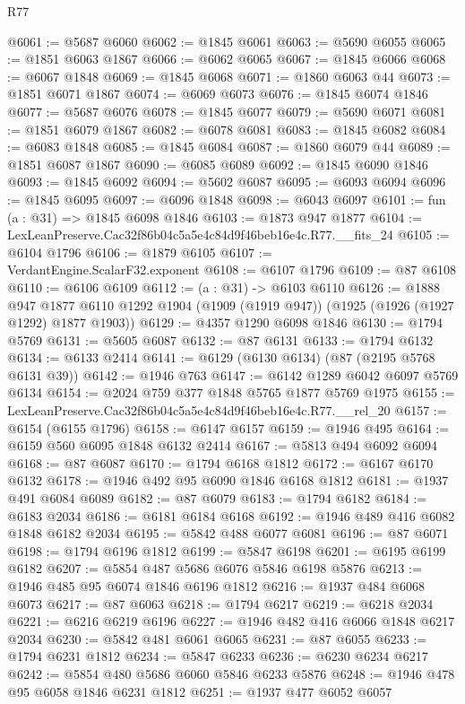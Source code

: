 \begin{lexlean}{R77}
\begin{coremodule}
@6061 := @5687 @6060
@6062 := @1845 @6061
@6063 := @5690 @6055
@6065 := @1851 @6063 @1867
@6066 := @6062 @6065
@6067 := @1845 @6066
@6068 := @6067 @1848
@6069 := @1845 @6068
@6071 := @1860 @6063 @44
@6073 := @1851 @6071 @1867
@6074 := @6069 @6073
@6076 := @1845 @6074 @1846
@6077 := @5687 @6076
@6078 := @1845 @6077
@6079 := @5690 @6071
@6081 := @1851 @6079 @1867
@6082 := @6078 @6081
@6083 := @1845 @6082
@6084 := @6083 @1848
@6085 := @1845 @6084
@6087 := @1860 @6079 @44
@6089 := @1851 @6087 @1867
@6090 := @6085 @6089
@6092 := @1845 @6090 @1846
@6093 := @1845 @6092
@6094 := @5602 @6087
@6095 := @6093 @6094
@6096 := @1845 @6095
@6097 := @6096 @1848
@6098 := @6043 @6097
@6101 := fun (a : @31) => @1845 @6098 @1846
@6103 := @1873 @947 @1877
@6104 := LexLeanPreserve.Cac32f86b04c5a5e4c84d9f46beb16e4c.R77.__fits_24
@6105 := @6104 @1796
@6106 := @1879 @6105
@6107 := VerdantEngine.ScalarF32.exponent
@6108 := @6107 @1796
@6109 := @87 @6108
@6110 := @6106 @6109
@6112 := (a : @31) -> @6103 @6110
@6126 := @1888
    @947
    @1877
    @6110
    @1292
    @1904
    (@1909 (@1919 @947))
    (@1925 (@1926 (@1927 @1292) @1877 @1903))
@6129 := @4357 @1290 @6098 @1846
@6130 := @1794 @5769
@6131 := @5605 @6087
@6132 := @87 @6131
@6133 := @1794 @6132
@6134 := @6133 @2414
@6141 := @6129 (@6130 @6134) (@87 (@2195 @5768 @6131 @39))
@6142 := @1946 @763
@6147 := @6142 @1289 @6042 @6097 @5769 @6134
@6154 := @2024 @759 @377 @1848 @5765 @1877 @5769 @1975
@6155 := LexLeanPreserve.Cac32f86b04c5a5e4c84d9f46beb16e4c.R77.__rel_20
@6157 := @6154 (@6155 @1796)
@6158 := @6147 @6157
@6159 := @1946 @495
@6164 := @6159 @560 @6095 @1848 @6132 @2414
@6167 := @5813 @494 @6092 @6094
@6168 := @87 @6087
@6170 := @1794 @6168 @1812
@6172 := @6167 @6170 @6132
@6178 := @1946 @492 @95 @6090 @1846 @6168 @1812
@6181 := @1937 @491 @6084 @6089
@6182 := @87 @6079
@6183 := @1794 @6182
@6184 := @6183 @2034
@6186 := @6181 @6184 @6168
@6192 := @1946 @489 @416 @6082 @1848 @6182 @2034
@6195 := @5842 @488 @6077 @6081
@6196 := @87 @6071
@6198 := @1794 @6196 @1812
@6199 := @5847 @6198
@6201 := @6195 @6199 @6182
@6207 := @5854 @487 @5686 @6076 @5846 @6198 @5876
@6213 := @1946 @485 @95 @6074 @1846 @6196 @1812
@6216 := @1937 @484 @6068 @6073
@6217 := @87 @6063
@6218 := @1794 @6217
@6219 := @6218 @2034
@6221 := @6216 @6219 @6196
@6227 := @1946 @482 @416 @6066 @1848 @6217 @2034
@6230 := @5842 @481 @6061 @6065
@6231 := @87 @6055
@6233 := @1794 @6231 @1812
@6234 := @5847 @6233
@6236 := @6230 @6234 @6217
@6242 := @5854 @480 @5686 @6060 @5846 @6233 @5876
@6248 := @1946 @478 @95 @6058 @1846 @6231 @1812
@6251 := @1937 @477 @6052 @6057

\end{coremodule}
\end{lexlean}
